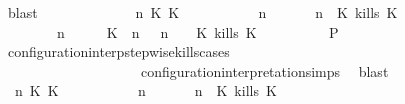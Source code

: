 \begin{isabellebody}
\ blast\isanewline
\ \ \ \ \isamarkupfalse%
\isanewline
\ \ \ \ \ \ \isamarkupfalse%
\ {\isasymGamma}\ n\ K\ K\ {\isasymPsi}\ {\isasymPhi}\isanewline
\ \ \ \ \ \ \isamarkupfalse%
\ {\isacartoucheopen}{\isacharparenleft}{\isasymGamma}\ n\ {\isasymturnstile}\ {\isasymPsi}\ {\isasymtriangleright}\ {\isasymPhi}\ {\isacharequal}\ {\isacharparenleft}{\isasymGamma}{\isacharcomma}\ n\ {\isasymturnstile}\ {\isacharparenleft}{\isacharparenleft}K\ kills\ K\ {\isacharhash}\ {\isasymPsi}{\isacharparenright}\ {\isasymtriangleright}\ {\isasymPhi}{\isacharparenright}{\isacartoucheclose}\isanewline
\ \ \ \ \ \ \ {\isacartoucheopen}{\isacharparenleft}{\isasymGamma}\ n\ {\isasymturnstile}\ {\isasymPsi}\ {\isasymtriangleright}\ {\isasymPhi}\ {\isacharequal}\ {\isacharparenleft}{\isacharparenleft}{\isacharparenleft}K\ {\isasymnot}{\isasymUp}\ n{\isacharparenright}\ {\isacharhash}\ {\isasymGamma}{\isacharparenright}{\isacharcomma}\ n\ {\isasymturnstile}\ {\isasymPsi}\ {\isasymtriangleright}\ {\isacharparenleft}{\isacharparenleft}K\ kills\ K\ {\isacharhash}\ {\isasymPhi}{\isacharparenright}{\isacharparenright}{\isacartoucheclose}\isanewline
\ \ \ \ \ \ \isamarkupfalse%
\ {\isacharquery}P\ \isamarkupfalse%
\ configuration{\isacharunderscore}interp{\isacharunderscore}stepwise{\isacharunderscore}kills{\isacharunderscore}cases\isanewline
\ \ \ \ \ \ \ \ \ \ \ \ \ \ \ \ \ \ \ \ configuration{\isacharunderscore}interpretation{\isachardot}simps\ \isamarkupfalse%
\ blast\isanewline
\ \ \ \ \isamarkupfalse%
\isanewline
\ \ \ \ \ \ \isamarkupfalse%
\ {\isasymGamma}\ n\ K\ K\ {\isasymPsi}\ {\isasymPhi}\isanewline
\ \ \ \ \ \ \isamarkupfalse%
\ {\isacartoucheopen}{\isacharparenleft}{\isasymGamma}\ n\ {\isasymturnstile}\ {\isasymPsi}\ {\isasymtriangleright}\ {\isasymPhi}\ {\isacharequal}\ {\isacharparenleft}{\isasymGamma}{\isacharcomma}\ n\ {\isasymturnstile}\ {\isacharparenleft}{\isacharparenleft}K\ kills\ K\ {\isacharhash}\ {\isasymPsi}{\isacharparenright}\ {\isasymtriangleright}\ {\isasymPhi}{\isacharparenright}{\isacartoucheclose}\isanewline

\end{isabellebody}
